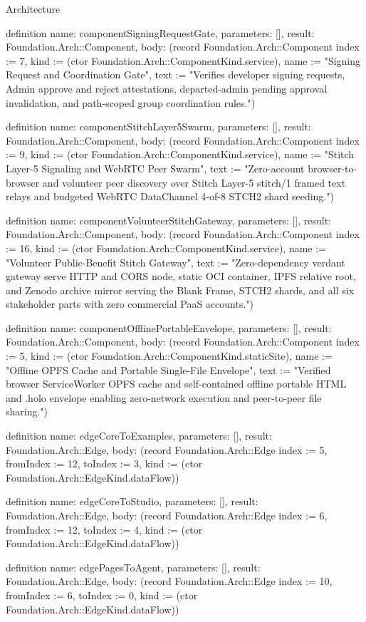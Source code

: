 \begin{lexlean}{Architecture}
\begin{semanticmodule}
definition{
  name: componentSigningRequestGate,
  parameters: [],
  result: Foundation.Arch::Component,
  body: (record Foundation.Arch::Component {index := 7, kind := (ctor Foundation.Arch::ComponentKind.service), name := "Signing Request and Coordination Gate", text := "Verifies developer signing requests, Admin approve and reject attestations, departed-admin pending approval invalidation, and path-scoped group coordination rules."})
}

definition{
  name: componentStitchLayer5Swarm,
  parameters: [],
  result: Foundation.Arch::Component,
  body: (record Foundation.Arch::Component {index := 9, kind := (ctor Foundation.Arch::ComponentKind.service), name := "Stitch Layer-5 Signaling and WebRTC Peer Swarm", text := "Zero-account browser-to-browser and volunteer peer discovery over Stitch Layer-5 stitch/1 framed text relays and budgeted WebRTC DataChannel 4-of-8 STCH2 shard seeding."})
}

definition{
  name: componentVolunteerStitchGateway,
  parameters: [],
  result: Foundation.Arch::Component,
  body: (record Foundation.Arch::Component {index := 16, kind := (ctor Foundation.Arch::ComponentKind.service), name := "Volunteer Public-Benefit Stitch Gateway", text := "Zero-dependency verdant gateway serve HTTP and CORS node, static OCI container, IPFS relative root, and Zenodo archive mirror serving the Blank Frame, STCH2 shards, and all six stakeholder parts with zero commercial PaaS accounts."})
}

definition{
  name: componentOfflinePortableEnvelope,
  parameters: [],
  result: Foundation.Arch::Component,
  body: (record Foundation.Arch::Component {index := 5, kind := (ctor Foundation.Arch::ComponentKind.staticSite), name := "Offline OPFS Cache and Portable Single-File Envelope", text := "Verified browser ServiceWorker OPFS cache and self-contained offline portable HTML and .holo envelope enabling zero-network execution and peer-to-peer file sharing."})
}

definition{
  name: edgeCoreToExamples,
  parameters: [],
  result: Foundation.Arch::Edge,
  body: (record Foundation.Arch::Edge {index := 5, fromIndex := 12, toIndex := 3, kind := (ctor Foundation.Arch::EdgeKind.dataFlow)})
}

definition{
  name: edgeCoreToStudio,
  parameters: [],
  result: Foundation.Arch::Edge,
  body: (record Foundation.Arch::Edge {index := 6, fromIndex := 12, toIndex := 4, kind := (ctor Foundation.Arch::EdgeKind.dataFlow)})
}

definition{
  name: edgePagesToAgent,
  parameters: [],
  result: Foundation.Arch::Edge,
  body: (record Foundation.Arch::Edge {index := 10, fromIndex := 6, toIndex := 0, kind := (ctor Foundation.Arch::EdgeKind.dataFlow)})
}


\end{semanticmodule}
\end{lexlean}
